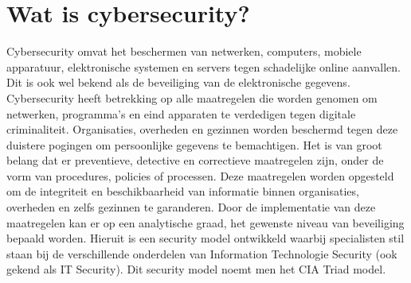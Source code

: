 \section{Wat is cybersecurity?}
Cybersecurity omvat het beschermen van netwerken, computers, mobiele apparatuur, elektronische systemen en servers tegen schadelijke online aanvallen. Dit is ook wel bekend als de beveiliging van de elektronische gegevens. Cybersecurity heeft betrekking op alle maatregelen die worden genomen om netwerken, programma’s en eind apparaten te verdedigen tegen digitale criminaliteit. Organisaties, overheden en gezinnen worden beschermd tegen deze duistere pogingen om persoonlijke gegevens te bemachtigen.
\newline
\newline 
Het is van groot belang dat er preventieve, detective en correctieve maatregelen zijn, onder de vorm van procedures, policies of processen. Deze maatregelen worden opgesteld om de integriteit en beschikbaarheid van informatie binnen organisaties, overheden en zelfs gezinnen te garanderen. Door de implementatie van deze maatregelen kan er op een analytische graad, het gewenste niveau van beveiliging bepaald worden. Hieruit is een security model ontwikkeld waarbij specialisten stil staan bij de verschillende onderdelen van Information Technologie Security (ook gekend als IT Security). Dit security model noemt men het CIA Triad model. 


